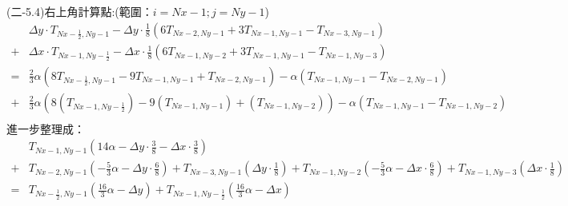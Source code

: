 \documentclass[12pt]{article}
\begin{document}
\noindent (二-5.4)右上角計算點:(範圍：$i = Nx-1 ; j = Ny-1$)\\
\begin{equation}
\begin{split}
  &\Delta y \cdot T_{Nx-\frac{1}{2},Ny-1}  
  - \Delta y \cdot \frac{1}{8}\left(6T_{Nx-2,Ny-1}+3T_{Nx-1,Ny-1}-T_{Nx-3,Ny-1}\right) \\
  + &\Delta x \cdot T_{Nx-1,Ny-\frac{1}{2}} 
  - \Delta x \cdot \frac{1}{8}\left(6T_{Nx-1,Ny-2}+3T_{Nx-1,Ny-1}-T_{Nx-1,Ny-3}\right) \\
  = & \frac{2}{3}\alpha (8T_{Nx-\frac{1}{2},Ny-1}-9T_{Nx-1,Ny-1}+T_{Nx-2,Ny-1})-  \alpha (T_{Nx-1,Ny-1}-T_{Nx-2,Ny-1})\\
+ & \frac{2}{3} \alpha (8(T_{Nx-1,Ny-\frac{1}{2}})-9(T_{Nx-1,Ny-1})+(T_{Nx-1,Ny-2})) -  \alpha (T_{Nx-1,Ny-1}-T_{Nx-1,Ny-2}) \\
\end{split}
\end{equation}
\noindent 進一步整理成：
\begin{equation}
  \begin{split}
    &T_{Nx-1,Ny-1}(14\alpha- \Delta y \cdot \frac{3}{8} - \Delta x \cdot \frac{3}{8})\\
     +& T_{Nx-2,Ny-1}(-\frac{5}{3}\alpha- \Delta y \cdot \frac{6}{8}) + T_{Nx-3,Ny-1}(\Delta y \cdot \frac{1}{8}) + T_{Nx-1,Ny-2}(-\frac{5}{3}\alpha- \Delta x \cdot \frac{6}{8}) + T_{Nx-1,Ny-3}(\Delta x \cdot \frac{1}{8}) \\
     =&T_{Nx-\frac{1}{2},Ny-1}(\frac{16}{3}\alpha -\Delta y) + T_{Nx-1,Ny-\frac{1}{2}}(\frac{16}{3}\alpha -\Delta x)\\ 
    \end{split}
\end{equation}
\end{document}
